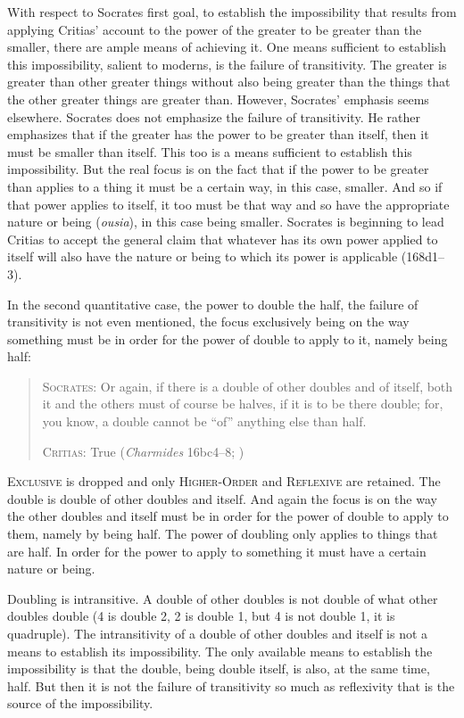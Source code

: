 With respect to Socrates first goal, to establish the impossibility that results from applying Critias' account to the power of the greater to be greater than the smaller, there are ample means of achieving it. One means sufficient to establish this impossibility, salient to moderns, is the failure of transitivity. The greater is greater than other greater things without also being greater than the things that the other greater things are greater than. However, Socrates' emphasis seems elsewhere. Socrates does not emphasize the failure of transitivity. He rather emphasizes that if the greater has the power to be greater than itself, then it must be smaller than itself. This too is a means sufficient to establish this impossibility. But the real focus is on the fact that if the power to be greater than applies to a thing it must be a certain way, in this case, smaller. And so if that power applies to itself, it too must be that way and so have the appropriate nature or being (\emph{ousia}), in this case being smaller. Socrates is beginning to lead Critias to accept the general claim that whatever has its own power applied to itself will also have the nature or being to which its power is applicable (168d1–3). 

In the second quantitative case, the power to double the half, the failure of transitivity is not even mentioned, the focus exclusively being on the way something must be in order for the power of double to apply to it, namely being half:
\begin{quotation}
	\textsc{Socrates}: Or again, if there is a double of other doubles and of itself, both it and the others must of course be halves, if it is to be there double; for, you know, a double cannot be ``of'' anything else than half.
	
	\textsc{Critias}: True (\emph{Charmides} 16bc4–8; \citealt[61–3]{Lamb:1927qw})
\end{quotation}
\textsc{Exclusive} is dropped and only \textsc{Higher-Order} and \textsc{Reflexive} are retained. The double is double of other doubles and itself. And again the focus is on the way the other doubles and itself must be in order for the power of double to apply to them, namely by being half. The power of doubling only applies to things that are half. In order for the power to apply to something it must have a certain nature or being.

Doubling is intransitive. A double of other doubles is not double of what other doubles double (4 is double 2, 2 is double 1, but 4 is not double 1, it is quadruple). The intransitivity of a double of other doubles and itself is not a means to establish its impossibility. The only available means to establish the impossibility is that the double, being double itself, is also, at the same time, half. But then it is not the failure of transitivity so much as reflexivity that is the source of the impossibility.

